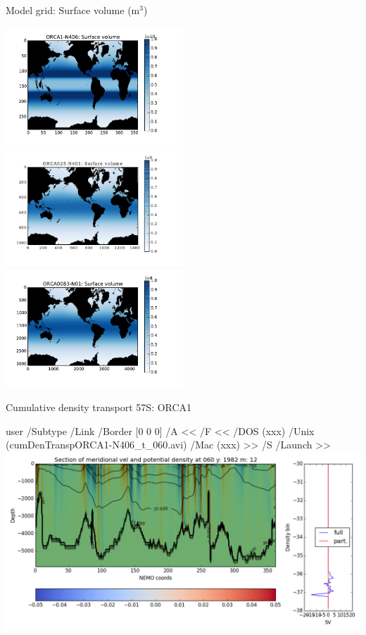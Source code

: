 \documentclass{beamer}
\newcommand{\LaunchBinary}[2]{%
  \leavevmode%
  \pdfstartlink user {
    /Subtype /Link
    /Border [0 0 0]%
    /A <<
      /F <<
         /DOS (xxx)
         /Unix (#1)
         /Mac (xxx)
      >>
      /S /Launch
    >>
  }#2%
  \pdfendlink%
}
\begin{document}
\begin{frame}{Model grid: Surface volume (m$^{3}$)}
\begin{center}
\includegraphics[width=0.5\textwidth]{ORCA1_surfVol.pdf}
\includegraphics[width=0.5\textwidth]{ORCA025_surfVol2.png}\\
\vspace{-0.4cm}
\includegraphics[width=0.5\textwidth]{ORCA12_surfVol.pdf}
\end{center}
\end{frame}

\begin{frame}{Cumulative density transport 57S: ORCA1}
\begin{center}
\LaunchBinary{cumDenTranspORCA1-N406_t_060.avi}{\includegraphics[width=1\textwidth]{cumDenTranspORCA1-N406_t_060_t_000.png}}%
\end{center}
\end{frame}
\end{document}
